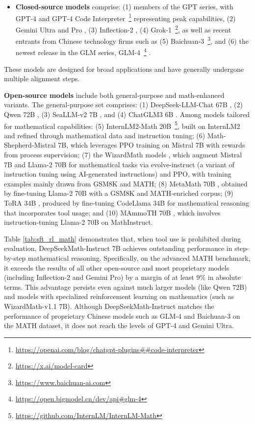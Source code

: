 \begin{itemize}[topsep=0pt]
    \item \textbf{Closed-source models} comprise: (1) members of the GPT series, with GPT-4 \citep{gpt4} and GPT-4 Code Interpreter~\footnote{\url{https://openai.com/blog/chatgpt-plugins\#\#code-interpreter}} representing peak capabilities, (2) Gemini Ultra and Pro \citep{gemini}, (3) Inflection-2 \citep{inflection-2}, (4) Grok-1~\footnote{\url{https://x.ai/model-card}}, as well as recent entrants from Chinese technology firms such as (5) Baichuan-3~\footnote{\url{https://www.baichuan-ai.com}}, and (6) the newest release in the GLM series, GLM-4~\footnote{\url{https://open.bigmodel.cn/dev/api\#glm-4}} \citep{glm}.
\end{itemize}

These models are designed for broad applications and have generally undergone multiple alignment steps.

\item \textbf{Open-source models} include both general-purpose and math-enhanced variants. The general-purpose set comprises: (1) DeepSeek-LLM-Chat 67B \citep{deepseek-llm}, (2) Qwen 72B \citep{qwen}, (3) SeaLLM-v2 7B \citep{seallm}, and (4) ChatGLM3 6B \citep{chatglm3}. Among models tailored for mathematical capabilities: (5) InternLM2-Math 20B~\footnote{\url{https://github.com/InternLM/InternLM-Math}}, built on InternLM2 and refined through mathematical data and instruction tuning; (6) Math-Shepherd-Mistral 7B, which leverages PPO training \citep{schulman2017proximal} on Mistral 7B \citep{mistral} with rewards from process supervision; (7) the WizardMath models \citep{wizardmath}, which augment Mistral 7B and Llama-2 70B \citep{llama2} for mathematical tasks via evolve-instruct (a variant of instruction tuning using AI-generated instructions) and PPO, with training examples mainly drawn from GSM8K and MATH; (8) MetaMath 70B \citep{metamath}, obtained by fine-tuning Llama-2 70B with a GSM8K and MATH-enriched corpus; (9) ToRA 34B \cite{tora}, produced by fine-tuning CodeLlama 34B for mathematical reasoning that incorporates tool usage; and (10) MAmmoTH 70B \citep{MathInstruct}, which involves instruction-tuning Llama-2 70B on MathInstruct.

Table \ref{tab:sft_rl_math} demonstrates that, when tool use is prohibited during evaluation, DeepSeekMath-Instruct 7B achieves outstanding performance in step-by-step mathematical reasoning. Specifically, on the advanced MATH benchmark, it exceeds the results of all other open-source and most proprietary models (including Inflection-2 and Gemini Pro) by a margin of at least 9\% in absolute terms. This advantage persists even against much larger models (like Qwen 72B) and models with specialized reinforcement learning on mathematics (such as WizardMath-v1.1 7B). Although DeepSeekMath-Instruct matches the performance of proprietary Chinese models such as GLM-4 and Baichuan-3 on the MATH dataset, it does not reach the levels of GPT-4 and Gemini Ultra.

